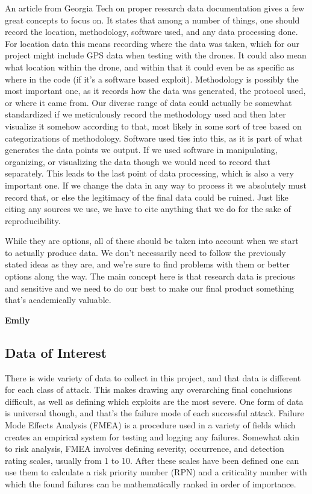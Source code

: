 \documentclass[IEEEtran,letterpaper,10pt,notitlepage,draftclsnofoot,onecolumn]{article}
\begin{document}
An article from Georgia Tech on proper research data documentation gives a few great concepts to focus on. \cite{GTDD}
It states that among a number of things, one should record the location, methodology, software used, and any data processing done.
For location data this means recording where the data was taken, which for our project might include GPS data when testing with the drones.
It could also mean what location within the drone, and within that it could even be as specific as where in the code (if it's a software based exploit).
Methodology is possibly the most important one, as it records how the data was generated, the protocol used, or where it came from.
Our diverse range of data could actually be somewhat standardized if we meticulously record the methodology used and then later visualize it somehow according to that, most likely in some sort of tree based on categorizations of methodology.
Software used ties into this, as it is part of what generates the data points we output.
If we used software in manipulating, organizing, or visualizing the data though we would need to record that separately.
This leads to the last point of data processing, which is also a very important one.
If we change the data in any way to process it we absolutely must record that, or else the legitimacy of the final data could be ruined.
Just like citing any sources we use, we have to cite anything that we do for the sake of reproducibility.

While they are options, all of these should be taken into account when we start to actually produce data.
We don't necessarily need to follow the previously stated ideas as they are, and we're sure to find problems with them or better options along the way.
The main concept here is that research data is precious and sensitive and we need to do our best to make our final product something that's academically valuable.

\textbf{Emily}

\subsection{Data of Interest}
There is wide variety of data to collect in this project, and that data is different for each class of attack.
This makes drawing any overarching final conclusions difficult, as well as defining which exploits are the most severe.
One form of data is universal though, and that's the failure mode of each successful attack.
Failure Mode Effects Analysis (FMEA) is a procedure used in a variety of fields which creates an empirical system for testing and logging any failures.
Somewhat akin to risk analysis, FMEA involves defining severity, occurrence, and detection rating scales, usually from 1 to 10.
After these scales have been defined one can use them to calculate a risk priority number (RPN) and a criticality number with which the found failures can be mathematically ranked in order of importance. \cite{FMEA}
\end{document}
